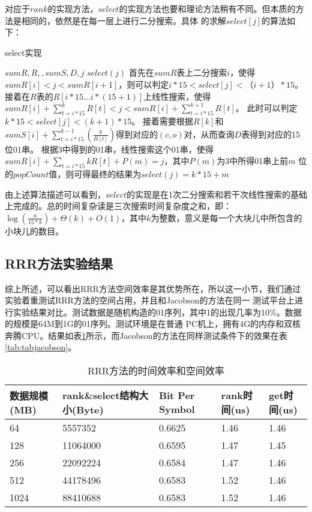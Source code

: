 对应于$rank$的实现方法，$select$的实现方法也要和理论方法稍有不同。但本质的方法是相同的，依然是在每一层上进行二分搜索。具体
的求解$select[j]$的算法如下：
\begin{algorithm}
    \caption{select实现}
    \begin{algorithmic}[1]
        \Require $sumR,R,,sumS,D,j$
        \Ensure $select(j)$
        \State 首先在$sumR$表上二分搜索$i$，使得$sumR[i]<j<sumR[i+1]$，则可以判定$i*15<select[j]<（i+1）*15$。
        \State 接着在$R$表的$R[i*15\ldots i*(15+1)]$上线性搜索，使得$sumR[i]+\sum_{t=i*15}^k R[t]<j< sumR[i]+\sum_{t=i*15}^{k+1}R[t]$。
    此时可以判定$k*15<select[j]<(k+1)*15$。
        \State 接着需要根据$R[k]$和$sumS[i]+\sum_{t=i*15}^{k-1}(\frac{b}{R[t]})$得到对应的$(c,o)$对，从而查询$D$表得到对应的15位01串。
        \State 根据3中得到的01串，线性搜索这个01串，使得$sumR[i]+\sum_{t=i*15}{k}R[t]+P(m)=j$，其中$P(m)$为3中所得01串上前$m$
    位的$popCount$值，则可得最终的结果为$select(j)=k*15+m$
    \end{algorithmic}
\end{algorithm}

由上述算法描述可以看到，$select$的实现是在1次二分搜索和若干次线性搜索的基础上完成的。总的时间复杂读是三次搜索时间复杂度之和，即：
$\log (\frac{n}{15*k}) +\Theta(k)+O(1)$，其中$k$为整数，意义是每一个大块儿中所包含的小块儿的数目。

\subsection{RRR方法实验结果}
综上所述，可以看出RRR方法空间效率是其优势所在，所以这一小节，我们通过实验着重测试RRR方法的空间占用，并且和Jacobson的方法在同一
测试平台上进行实验结果对比。测试数据是随机构造的01序列，其中1的出现几率为10\%。数据的规模是64M到1G的01序列。测试环境是在普通
PC机上，拥有4G的内存和双核奔腾CPU。结果如表\ref{tab:tabrrr}所示，而Jacobson的方法在同样测试条件下的效果在表\ref{tab:tabjacobson}。

\begin{table}[htbp]
    \caption{RRR方法的时间效率和空间效率}
    \label{tab:tabrrr}
    \centering
    \begin{tabularx}{1.0\textwidth}{lXlll}
        \toprule
        数据规模(MB)&rank\&select结构大小(Byte)&Bit Per Symbol&rank时间(us)&get时间(us)\\
        \midrule
        64&5557352&0.6625&1.46&1.46\\
        128&11064000&0.6595&1.47&1.45\\
        256&22092224&0.6584&1.47&1.46\\
        512&44178496&0.6583&1.52&1.46\\
        1024&88410688&0.6583&1.52&1.46\\
        \bottomrule
    \end{tabularx}
\end{table}

